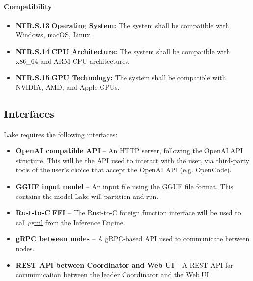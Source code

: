 \documentclass[12pt]{article}
\begin{document}
\paragraph{Compatibility}
\begin{itemize}
	\item \label{NFR.S.13}\textbf{NFR.S.13} \textbf{Operating System:} The system shall be compatible with Windows, macOS, Linux.
	\item \label{NFR.S.14}\textbf{NFR.S.14} \textbf{CPU Architecture:} The system shall be compatible with x86\_64 and ARM CPU architectures.
	\item \label{NFR.S.15}\textbf{NFR.S.15} \textbf{GPU Technology:} The system shall be compatible with NVIDIA, AMD, and Apple GPUs.
\end{itemize}

\subsection{Interfaces}\label{subsec:interfaces}
Lake requires the following interfaces:
\begin{itemize}
    \item \textbf{OpenAI compatible API} -- An HTTP server, following the OpenAI API structure.
		This will be the API used to interact with the user, via third-party tools of the user's
		choice that accept the OpenAI API (e.g. \href{https://opencode.ai/}{OpenCode}).
	\item \textbf{GGUF input model} -- An input file using the
		\href{https://github.com/ggml-org/ggml/blob/master/docs/gguf.md}{GGUF} file format. This contains
		the model Lake will partition and run.
	\item \textbf{Rust-to-C FFI} -- The Rust-to-C foreign function interface will be used to call
		\href{https://github.com/ggml-org/ggml}{ggml} from the Inference Engine.
	\item \textbf{gRPC between nodes} -- A gRPC-based API used to communicate between nodes.
	\item \textbf{REST API between Coordinator and Web UI} -- A REST API for communication between the
		leader Coordinator and the Web UI.
\end{itemize}
\end{document}
